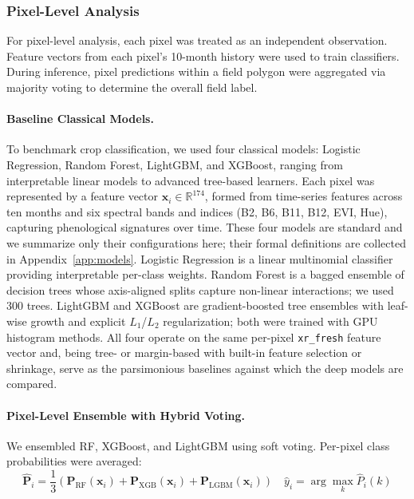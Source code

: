 \documentclass[pdflatex,sn-mathphys]{sn-jnl} %
\begin{document}
\subsubsection{Pixel-Level Analysis}

For pixel-level analysis, each pixel was treated as an independent observation. Feature vectors from each pixel’s 10-month history were used to train classifiers. During inference, pixel predictions within a field polygon were aggregated via majority voting to determine the overall field label.

\paragraph{Baseline Classical Models.}

To benchmark crop classification, we used four classical models: Logistic Regression, Random Forest, LightGBM, and XGBoost, ranging from interpretable linear models to advanced tree-based learners. Each pixel was represented by a feature vector $\mathbf{x}_i \in \mathbb{R}^{174}$, formed from time-series features across ten months and six spectral bands and indices (B2, B6, B11, B12, EVI, Hue), capturing phenological signatures over time. These four models are standard and we summarize only their configurations here;
their formal definitions are collected in Appendix~\ref{app:models}.
Logistic Regression \cite{james2013} is a linear multinomial classifier
providing interpretable per-class weights. Random Forest \cite{breiman2001}
is a bagged ensemble of decision trees whose axis-aligned splits capture non-linear
interactions; we used 300 trees. LightGBM \cite{ke2017} and
XGBoost \cite{chen2016, friedman2001} are gradient-boosted tree ensembles
with leaf-wise growth and explicit $L_1$/$L_2$ regularization; both were trained with
GPU histogram methods. All four operate on the same per-pixel \texttt{xr\_fresh}
feature vector and, being tree- or margin-based with built-in feature selection or
shrinkage, serve as the parsimonious baselines against which the deep models are
compared.

\paragraph{Pixel-Level Ensemble with Hybrid Voting.}

We ensembled RF, XGBoost, and LightGBM using soft voting. Per-pixel class probabilities were averaged:
\[
\hat{\mathbf{P}}_i = \frac{1}{3} \left( \mathbf{P}_{\text{RF}}(\mathbf{x}_i) + \mathbf{P}_{\text{XGB}}(\mathbf{x}_i) + \mathbf{P}_{\text{LGBM}}(\mathbf{x}_i) \right)
\quad
\hat{y}_i = \arg\max_k \hat{P}_i(k)
\]
\end{document}
